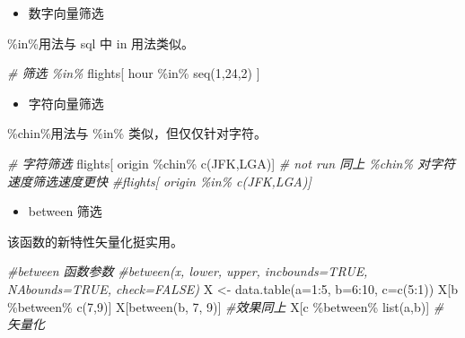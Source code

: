 \documentclass[
]{book}
\newenvironment{Shaded}{\begin{snugshade}}{\end{snugshade}}
\newcommand{\AttributeTok}[1]{\textcolor[rgb]{0.77,0.63,0.00}{#1}}
\newcommand{\CommentTok}[1]{\textcolor[rgb]{0.56,0.35,0.01}{\textit{#1}}}
\newcommand{\DecValTok}[1]{\textcolor[rgb]{0.00,0.00,0.81}{#1}}
\newcommand{\FunctionTok}[1]{\textcolor[rgb]{0.00,0.00,0.00}{#1}}
\newcommand{\NormalTok}[1]{#1}
\newcommand{\OtherTok}[1]{\textcolor[rgb]{0.56,0.35,0.01}{#1}}
\newcommand{\SpecialCharTok}[1]{\textcolor[rgb]{0.00,0.00,0.00}{#1}}
\newcommand{\StringTok}[1]{\textcolor[rgb]{0.31,0.60,0.02}{#1}}
\providecommand{\tightlist}{%
  \setlength{\itemsep}{0pt}\setlength{\parskip}{0pt}}
\begin{document}
\begin{itemize}
\tightlist
\item
  数字向量筛选
\end{itemize}

\%in\%用法与 sql 中 in 用法类似。

\begin{Shaded}
\begin{Highlighting}[]
\CommentTok{\# 筛选 \%in\% }
\NormalTok{flights[ hour }\SpecialCharTok{\%in\%} \FunctionTok{seq}\NormalTok{(}\DecValTok{1}\NormalTok{,}\DecValTok{24}\NormalTok{,}\DecValTok{2}\NormalTok{) ]}
\end{Highlighting}
\end{Shaded}

\begin{itemize}
\tightlist
\item
  字符向量筛选
\end{itemize}

\%chin\%用法与 \%in\% 类似，但仅仅针对字符。

\begin{Shaded}
\begin{Highlighting}[]
\CommentTok{\# 字符筛选}
\NormalTok{flights[ origin }\SpecialCharTok{\%chin\%} \FunctionTok{c}\NormalTok{(}\StringTok{\textquotesingle{}JFK\textquotesingle{}}\NormalTok{,}\StringTok{\textquotesingle{}LGA\textquotesingle{}}\NormalTok{)]}
\CommentTok{\# not run 同上 \%chin\% 对字符速度筛选速度更快}
\CommentTok{\#flights[ origin \%in\% c(\textquotesingle{}JFK\textquotesingle{},\textquotesingle{}LGA\textquotesingle{})]}
\end{Highlighting}
\end{Shaded}

\begin{itemize}
\tightlist
\item
  between 筛选
\end{itemize}

该函数的新特性矢量化挺实用。

\begin{Shaded}
\begin{Highlighting}[]
\CommentTok{\#between 函数参数}
\CommentTok{\#between(x, lower, upper, incbounds=TRUE, NAbounds=TRUE, check=FALSE)}
\NormalTok{X }\OtherTok{\textless{}{-}}  \FunctionTok{data.table}\NormalTok{(}\AttributeTok{a=}\DecValTok{1}\SpecialCharTok{:}\DecValTok{5}\NormalTok{, }\AttributeTok{b=}\DecValTok{6}\SpecialCharTok{:}\DecValTok{10}\NormalTok{, }\AttributeTok{c=}\FunctionTok{c}\NormalTok{(}\DecValTok{5}\SpecialCharTok{:}\DecValTok{1}\NormalTok{))}
\NormalTok{X[b }\SpecialCharTok{\%between\%} \FunctionTok{c}\NormalTok{(}\DecValTok{7}\NormalTok{,}\DecValTok{9}\NormalTok{)]}
\NormalTok{X[}\FunctionTok{between}\NormalTok{(b, }\DecValTok{7}\NormalTok{, }\DecValTok{9}\NormalTok{)] }\CommentTok{\#效果同上}
\NormalTok{X[c }\SpecialCharTok{\%between\%} \FunctionTok{list}\NormalTok{(a,b)] }\CommentTok{\# 矢量化}
\end{Highlighting}
\end{Shaded}
\end{document}
